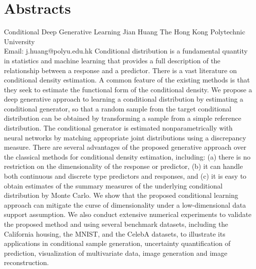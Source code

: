 \documentclass[
	openany, %
	parskip=full, %
	12pt, %
	a4paper, %
]{conferencebooklet} %
\begin{document}
\chapter*{Abstracts}
\abstract
    {Conditional Deep Generative Learning}
    {Jian Huang}
    {}
    {The Hong Kong Polytechnic University\\
    Email: j.huang@polyu.edu.hk}
    {Conditional distribution is a fundamental quantity in statistics and machine learning that provides a full description of the relationship between a response and a predictor. There is a vast literature on conditional density estimation. A common feature of the existing methods is that they seek to estimate the functional form of the conditional density. We propose a deep generative approach to learning a conditional distribution by estimating a conditional generator, so that a random sample from the target conditional distribution can be obtained by transforming a sample from a simple reference distribution. The conditional generator is estimated nonparametrically with neural networks by matching appropriate joint distributions using a discrepancy measure. There are several advantages of the proposed generative approach over the classical methods for conditional density estimation, including: (a) there is no restriction on the dimensionality of the response or predictor, (b) it can handle both continuous and discrete type predictors and responses, and (c) it is easy to obtain estimates of the summary measures of the underlying conditional distribution by Monte Carlo. We show that the proposed conditional learning approach can mitigate the curse of dimensionality under a low-dimensional data support assumption. We also conduct extensive numerical experiments to validate the proposed method and using several benchmark datasets, including the California housing, the MNIST, and the CelebA datasets, to illustrate its applications in conditional sample generation, uncertainty quantification of prediction, visualization of multivariate data, image generation and image reconstruction.}
\end{document}
